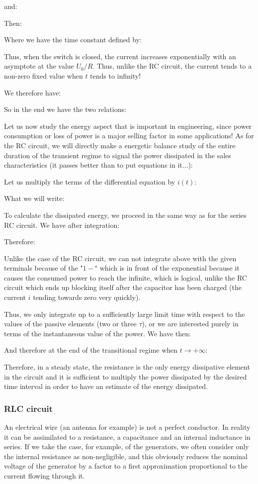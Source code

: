 	and:
	
	Then:
	
	Where we have the time constant defined by:
	
	Thus, when the switch is closed, the current increases exponentially with an asymptote at the value $U_0/R$. Thus, unlike the RC circuit, the current tends to a non-zero fixed value when $t$ tends to infinity!
	
	We therefore have:
	
	So in the end we have the two relations:
	
	Let us now study the energy aspect that is important in engineering, since power consumption or loss of power is a major selling factor in some applications! As for the RC circuit, we will directly make a energetic balance study of the entire duration of the transient regime to signal the power dissipated in the sales characteristics (it passes better than to put equations in it...):
	
	Let us multiply the terms of the differential equation by $i(t)$:
	
	What we will write:
	
	To calculate the dissipated energy, we proceed in the same way as for the series RC circuit. We have after integration:
	
	Therefore:
	
	Unlike the case of the RC circuit, we can not integrate above with the given terminals because of the "$1-$" which is in front of the exponential because it causes the consumed power to reach the infinite, which is logical, unlike the RC circuit which ends up blocking itself after the capacitor has been charged (the current $i$ tending towards zero very quickly).

	Thus, we only integrate up to a sufficiently large limit time with respect to the values of the passive elements (two or three $\tau$), or we are interested purely in terms of the instantaneous value of the power. We have then:
	
	And therefore at the end of the transitional regime when $t\rightarrow +\infty$:
	
	Therefore, in a steady state, the resistance is the only energy dissipative element in the circuit and it is sufficient to multiply the power dissipated by the desired time interval in order to have an estimate of the energy dissipated.
	
	\subsubsection{RLC circuit}\label{rlc circuit}
	An electrical wire (an antenna for example) is not a perfect conductor. In reality it can be assimilated to a resistance, a capacitance and an internal inductance in series. If we take the case, for example, of the generators, we often consider only the internal resistance as non-negligible, and this obviously reduces the nominal voltage of the generator by a factor to a first approximation proportional to the current flowing through it.

